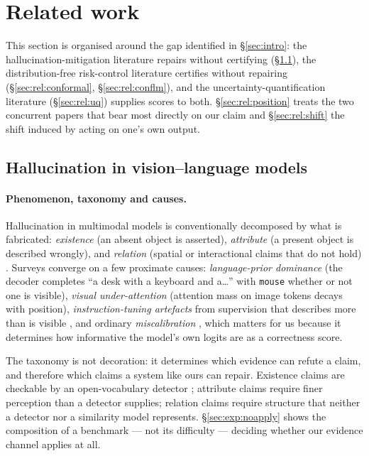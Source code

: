 \documentclass[review,number,doubleblind]{elsarticle}
\theoremstyle{plain}
\theoremstyle{definition}
\theoremstyle{remark}
\begin{document}
\section{Related work}
\label{sec:related}

This section is organised around the gap identified in \S\ref{sec:intro}: the
hallucination-mitigation literature repairs without certifying (\S\ref{sec:rel:hallu}), the
distribution-free risk-control literature certifies without repairing
(\S\ref{sec:rel:conformal}, \S\ref{sec:rel:conflm}), and the uncertainty-quantification
literature (\S\ref{sec:rel:uq}) supplies scores to both. \S\ref{sec:rel:position} treats the
two concurrent papers that bear most directly on our claim and \S\ref{sec:rel:shift} the
shift induced by acting on one's own output.

\subsection{Hallucination in vision--language models}
\label{sec:rel:hallu}

\paragraph{Phenomenon, taxonomy and causes.}
Hallucination in multimodal models is conventionally decomposed by what is fabricated:
\emph{existence} (an absent object is asserted), \emph{attribute} (a present object is
described wrongly), and \emph{relation} (spatial or interactional claims that do not hold)
\citep{amber}. Surveys \citep{bai2024survey,liu2024survey,ji2023} converge on a few proximate
causes: \emph{language-prior dominance} (the decoder completes ``a desk with a keyboard
and a\dots'' with \texttt{mouse} whether or not one is visible), \emph{visual
under-attention} (attention mass on image tokens decays with position), \emph{instruction-tuning
artefacts} from supervision that describes more than is visible \citep{liu2023lrv}, and
ordinary \emph{miscalibration} \citep{guo2017}, which matters for us because it determines how
informative the model's own logits are as a correctness score.

The taxonomy is not decoration: it determines which evidence can refute a claim, and
therefore which claims a system like ours can repair. Existence claims are checkable by an
open-vocabulary detector \citep{owlv2,liu2024groundingdino}; attribute claims require finer
perception than a detector supplies; relation claims require structure that neither a detector
nor a similarity model represents. \S\ref{sec:exp:noapply} shows the composition of a
benchmark --- not its difficulty --- deciding whether our evidence channel applies at all.
\end{document}
